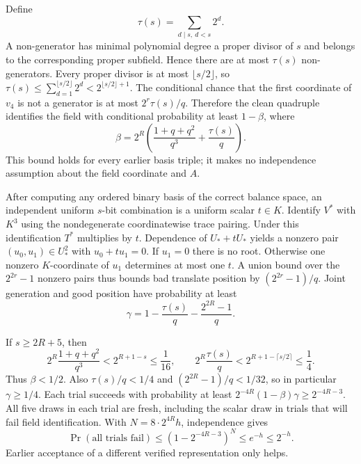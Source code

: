 \documentclass[11pt]{article}
\begin{document}
Define
\[
 \tau(s)=\sum_{d\mid s,\ d<s}2^d.
\]
A non-generator has minimal polynomial degree a proper divisor of $s$ and
belongs to the corresponding proper subfield. Hence there are at most
$\tau(s)$ non-generators. Every proper divisor is at most $\lfloor s/2\rfloor$,
so $\tau(s)\leq\sum_{d=1}^{\lfloor s/2\rfloor}2^d<2^{\lfloor s/2\rfloor+1}$.
The conditional chance that the first coordinate of $v_4$ is not a generator
is at most $2^r\tau(s)/q$. Therefore the clean quadruple identifies the
field with conditional probability at least $1-\beta$, where
\begin{equation}\label{eq:beta}
 \beta=2^R\left(\frac{1+q+q^2}{q^3}+\frac{\tau(s)}q\right).
\end{equation}
This bound holds for every earlier basis triple; it makes no independence
assumption about the field coordinate and $A$.

After computing any ordered binary basis of the correct balance space,
an independent uniform $s$-bit combination is a uniform scalar $t\in K$.
Identify $V^*$ with $K^3$ using the nondegenerate coordinatewise trace
pairing. Under this identification $T^*$ multiplies by $t$. Dependence of
$U_*+tU_*$ yields a nonzero pair $(u_0,u_1)\in U_*^2$ with
$u_0+t u_1=0$. If $u_1=0$ there is no root. Otherwise one nonzero
$K$-coordinate of $u_1$ determines at most one $t$. A union bound over
the $2^{2r}-1$ nonzero pairs thus bounds bad translate position by
$(2^{2r}-1)/q$. Joint generation and good position have probability at least
\begin{equation}\label{eq:gamma}
 \gamma=1-\frac{\tau(s)}q-\frac{2^{2R}-1}q.
\end{equation}

If $s\geq2R+5$, then
\[
 2^R\frac{1+q+q^2}{q^3}<2^{R+1-s}\leq\frac1{16},\qquad
 2^R\frac{\tau(s)}q<2^{R+1-\lceil s/2\rceil}\leq\frac14.
\]
Thus $\beta<1/2$. Also $\tau(s)/q<1/4$ and
$(2^{2R}-1)/q<1/32$, so in particular $\gamma\geq1/4$.
Each trial succeeds with probability at least
$2^{-4R}(1-\beta)\gamma\geq2^{-4R-3}$.
All five draws in each trial are fresh, including the scalar draw in trials
that will fail field identification. With $N=8\cdot2^{4R}h$, independence gives
\[
 \Pr(\text{all trials fail})\leq(1-2^{-4R-3})^N
 \leq e^{-h}\leq2^{-h}.
\]
Earlier acceptance of a different verified representation only helps.
\end{document}

